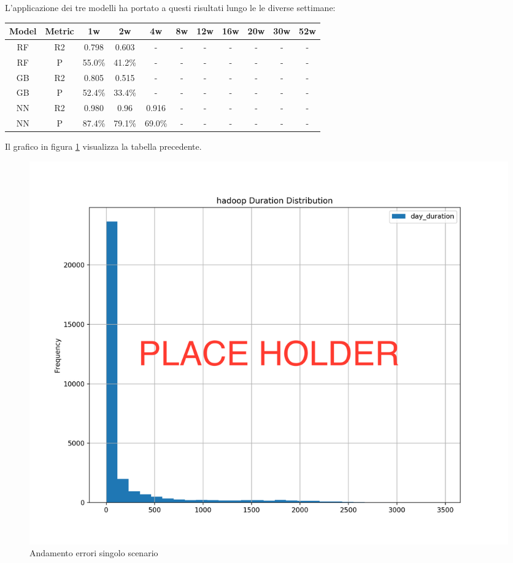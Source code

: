\documentclass[%
    corpo=12pt,
    twoside,
    oldstyle,
    autoretitolo,
    greek,
    evenboxes,
]{toptesi}
\begin{document}
L'applicazione dei tre modelli ha portato a questi risultati lungo le le diverse settimane:
\begin{center}
   \label{tab:single_scen_hadoop}
  \begin{tabular}{ |c|c|c|c|c|c|c|c|c|c|c| }
     \hline
     \textbf{Model} & \textbf{Metric} & \textbf{1w} & \textbf{2w} & \textbf{4w} & \textbf{8w} & \textbf{12w} & \textbf{16w} & \textbf{20w} & \textbf{30w}  & \textbf{52w} \\
     \hline
     \hline
     RF & R2 & 0.798 & 0.603 & - & - & - & - & - & - & -\\
     \hline
     RF & P & 55.0\% & 41.2\% & - & - & - & - & - & - & -\\
     \hline
     \hline
     GB & R2 & 0.805 & 0.515 & - & - & - & - & - & - & -\\
     \hline
     GB & P & 52.4\% & 33.4\% & - & - & - & - & - & - & -\\
     \hline
     \hline
     NN & R2 & 0.980 & 0.96 & 0.916 & - & - & - & - & - & -\\
     \hline
     NN & P & 87.4\% & 79.1\% & 69.0\% & - & - & - & - & - & -\\
     \hline
  \end{tabular}
\end{center}
Il grafico in figura \ref{fig:single_scenario_error} visualizza la tabella precedente.
\begin{figure}[!ht]
  \includegraphics[width=\linewidth]{figure/place_holder.png}
  \caption{Andamento errori singolo scenario}
  \label{fig:single_scenario_error}
\end{figure}
\end{document}
